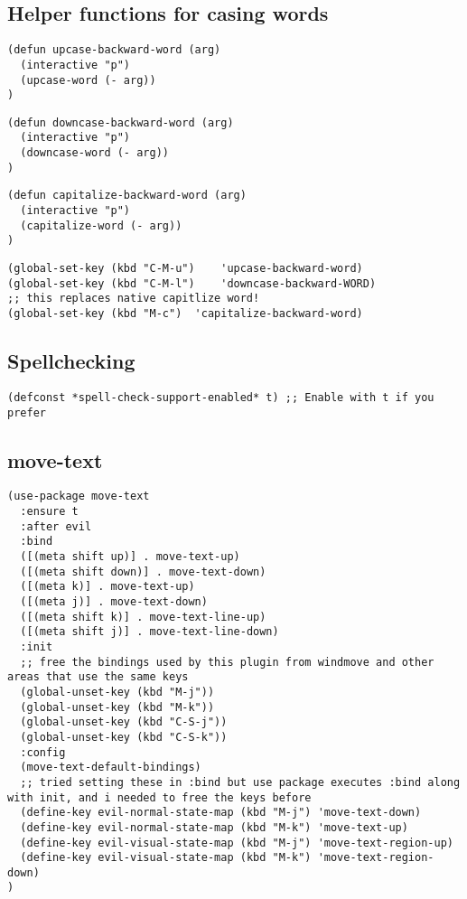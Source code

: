 \documentclass[11pt]{article}
\begin{document}
\subsection*{Helper functions for casing words}
\label{sec:org9773b37}

\begin{verbatim}
(defun upcase-backward-word (arg)
  (interactive "p")
  (upcase-word (- arg))
)
\end{verbatim}

\begin{verbatim}
(defun downcase-backward-word (arg)
  (interactive "p")
  (downcase-word (- arg))
)
\end{verbatim}

\begin{verbatim}
(defun capitalize-backward-word (arg)
  (interactive "p")
  (capitalize-word (- arg))
)
\end{verbatim}

\begin{verbatim}
(global-set-key (kbd "C-M-u")	 'upcase-backward-word)
(global-set-key (kbd "C-M-l")	 'downcase-backward-WORD)
;; this replaces native capitlize word!
(global-set-key (kbd "M-c")	 'capitalize-backward-word)
\end{verbatim}

\subsection*{Spellchecking}
\label{sec:org1ce2eac}

\begin{verbatim}
(defconst *spell-check-support-enabled* t) ;; Enable with t if you prefer
\end{verbatim}


\subsection*{move-text}
\label{sec:org806abc5}

\begin{verbatim}
(use-package move-text
  :ensure t
  :after evil
  :bind
  ([(meta shift up)] . move-text-up)
  ([(meta shift down)] . move-text-down)
  ([(meta k)] . move-text-up)
  ([(meta j)] . move-text-down)
  ([(meta shift k)] . move-text-line-up)
  ([(meta shift j)] . move-text-line-down)
  :init
  ;; free the bindings used by this plugin from windmove and other areas that use the same keys
  (global-unset-key (kbd "M-j"))
  (global-unset-key (kbd "M-k"))
  (global-unset-key (kbd "C-S-j"))
  (global-unset-key (kbd "C-S-k"))
  :config
  (move-text-default-bindings)
  ;; tried setting these in :bind but use package executes :bind along with init, and i needed to free the keys before
  (define-key evil-normal-state-map (kbd "M-j") 'move-text-down)
  (define-key evil-normal-state-map (kbd "M-k") 'move-text-up)
  (define-key evil-visual-state-map (kbd "M-j") 'move-text-region-up)
  (define-key evil-visual-state-map (kbd "M-k") 'move-text-region-down)
)
\end{verbatim}
\end{document}

